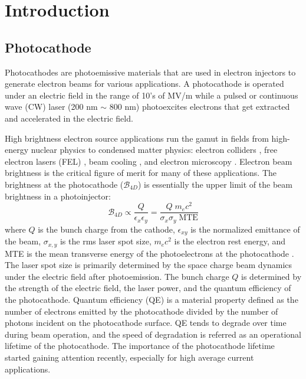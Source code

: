 \chapter{Introduction}

\section{Photocathode}

Photocathodes are photoemissive materials that are used in electron injectors to generate electron beams for various applications.
A photocathode is operated under an electric field in the range of 10's of MV/m \cite{musumeci2018advances} while a pulsed or continuous wave (CW) laser (200 nm $\sim$ 800 nm) photoexcites electrons that get extracted and accelerated in the electric field.

High brightness electron source applications run the gamut in fields from high-energy nuclear physics to condensed matter physics: electron colliders \cite{wang2022high,ilc2019}, free electron lasers (FEL) \cite{ackermann2007operation}, beam cooling \cite{orlov2004ultra}, and electron microscopy \cite{kuwahara2012_30kVSpinpolarizedTransmission}.
Electron beam brightness is the critical figure of merit for many of these applications.
The brightness at the photocathode ($\mathcal{B}_{4D}$) is essentially the upper limit of the beam brightness in a photoinjector:
\begin{equation}
\mathcal{B}_{4D} \propto \frac{Q}{\epsilon_x \epsilon_y} = \frac{Q \; m_e c^2}{\sigma_x \sigma_y \; \textrm{MTE}} 
\end{equation}
where $Q$ is the bunch charge from the cathode, $\epsilon_{x y}$ is the normalized emittance of the beam, $\sigma_{x,y}$ is the rms laser spot size, $m_e c^2$ is the electron rest energy, and MTE is the mean transverse energy of the photoelectrons at the photocathode \cite{Musumeci2018,bae2018_BrightnessFemtosecondNonequilibrium}. The laser spot size is primarily determined by the space charge beam dynamics under the electric field after photoemission.
The bunch charge $Q$ is determined by the strength of the electric field, the laser power, and the quantum efficiency of the photocathode. Quantum efficiency (QE) is a material property defined as the number of electrons emitted by the photocathode divided by the number of photons incident on the photocathode surface. QE tends to degrade over time during beam operation, and the speed of degradation is referred as an operational lifetime of the photocathode.
The importance of the photocathode lifetime started gaining attention recently, especially for high average current applications. 

